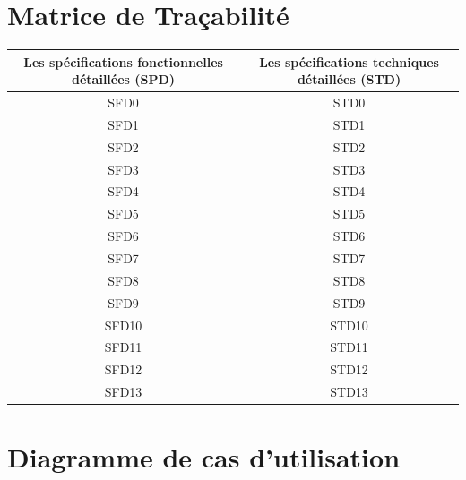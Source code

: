 \documentclass[a4paper,12pt]{article}
\begin{document}
\newpage
\section{Matrice de Traçabilité}
\begin{center}
\begin{tabular}{|c|c|}
\hline
Les spécifications fonctionnelles détaillées (SPD) & Les spécifications techniques détaillées (STD) \\
\hline
\hline
SFD0 & STD0\\
\hline
SFD1 & STD1\\
\hline
SFD2 & STD2\\
\hline
SFD3 & STD3\\
\hline
SFD4 & STD4\\
\hline
SFD5 & STD5\\
\hline
SFD6 & STD6\\
\hline
SFD7 & STD7\\
\hline
SFD8 & STD8\\
\hline
SFD9 & STD9\\
\hline
SFD10 & STD10\\
\hline
SFD11 & STD11\\
\hline
SFD12 & STD12\\
\hline
SFD13 & STD13\\
\hline
\end{tabular}
\end{center}



\appendix
\newpage

\section{Diagramme de cas d'utilisation}
\end{document}
